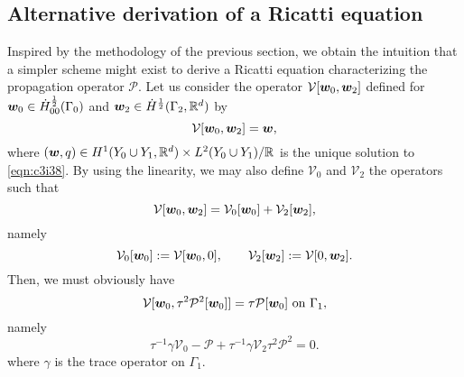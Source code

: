 \documentclass[a4paper,10pt,reqno]{amsart}
\begin{document}
\subsection{Alternative derivation of a Ricatti equation}
Inspired by the methodology of the previous section, we obtain the intuition that
a simpler scheme might exist to derive a Ricatti equation characterizing the
propagation operator $\mathcal{P}$. Let us consider the operator
$\mathcal{V}[{\bm w}_0,{\bm w}_2]$ defined for ${\bm w}_0\in \dot{H}^{\frac{1}{2}}_{00}(\Gamma_0)$ and ${\bm w}_2\in \dot
H^{\frac{1}{2}}(\Gamma_2,\mathbb{R}^{d})$ by    
\begin{equation}
\label{eqn:88eqm}   
\mathcal{V}[{\bm w}_0,{\bm w}_2]={\bm w},
\end{equation}  
where $({\bm w},q)\in H^{1}(Y_0\cup Y_1,\mathbb{R}^{d})\times L^{2}(Y_0\cup Y_1)/\mathbb{R}$ is the unique solution to \cref{eqn:c3i38}. 
By using the linearity, we may also define $\mathcal{V}_0$ and $\mathcal{V}_2$ the operators such that  
\[
    \mathcal{V}[{\bm w}_0,{\bm w}_2]=\mathcal{V}_0[{\bm w}_0]+\mathcal{V}_2[{\bm w}_2],
\]
namely  
\[
    \mathcal{V}_0[{\bm w}_0]:=\mathcal{V}[{\bm w}_0,0],\qquad
    \mathcal{V}_2[{\bm w}_2]:=\mathcal{V}[0,{\bm w}_2].
\] 
Then, we must obviously have    
\[
    \mathcal{V}[\w_0,\tau^{2}\mathcal{P}^{2}[\w_0]]=\tau\mathcal{P} [\w_0] \On \Gamma_1,
\] 
namely  
\[
\tau^{-1}\gamma\mathcal{V}_0-\mathcal{P}+\tau^{-1}\gamma\mathcal{V}_2\tau^{2} \mathcal{P}^{2}=0.
\] 
where $\gamma$ is the trace operator on $\Gamma_1$.


\end{document}

